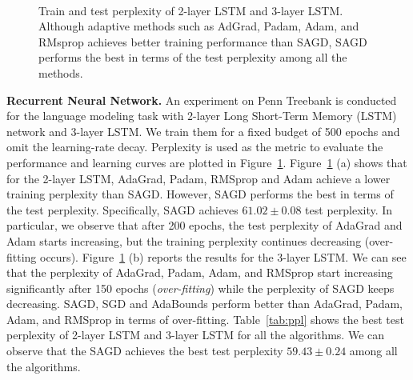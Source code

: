 \documentclass[11pt]{article}
\begin{document}
\begin{figure}[t] 
 \mbox{
}
 \caption[]{Train and test perplexity of 2-layer LSTM and 3-layer LSTM. 
 Although adaptive methods such as AdGrad, Padam, Adam, and RMsprop achieves better training performance than \textsc{SAGD}, \textsc{SAGD} performs the best in terms of the test perplexity among all the methods.
} 
 \label{fig:cifar10}
\end{figure}


\textbf{Recurrent Neural Network.}
An experiment on Penn Treebank is conducted for the language modeling task with 2-layer Long Short-Term Memory (LSTM)~\citep{stni2018} network and 3-layer LSTM. We train them for a fixed budget of 500 epochs and omit the learning-rate decay. Perplexity is used as the metric to evaluate the performance and learning curves are plotted in Figure~\ref{fig:cifar10}. 
Figure~\ref{fig:cifar10} (a) shows that for the 2-layer LSTM, AdaGrad, Padam, RMSprop and Adam achieve a lower training perplexity than \textsc{SAGD}. However, \textsc{SAGD} performs the best in terms of the test perplexity. Specifically, \textsc{SAGD} achieves $61.02 \pm 0.08$ test perplexity. 
In particular, we observe that after 200 epochs, the test perplexity of AdaGrad and Adam starts increasing, but the training perplexity continues decreasing (over-fitting occurs).  
Figure~\ref{fig:cifar10} (b) reports the results for the 3-layer LSTM. We can see that the perplexity of AdaGrad, Padam, Adam, and RMSprop start increasing significantly after 150 epochs (\emph{over-fitting}) while the perplexity of \textsc{SAGD} keeps decreasing. \textsc{SAGD}, SGD and AdaBounds perform better than AdaGrad, Padam, Adam, and RMSprop in terms of over-fitting.
Table~\ref{tab:ppl} shows the best test perplexity of 2-layer LSTM and 3-layer LSTM for all the algorithms. We can observe that the \textsc{SAGD} achieves the best test perplexity $59.43 \pm 0.24$ among all the algorithms. 
\end{document}
